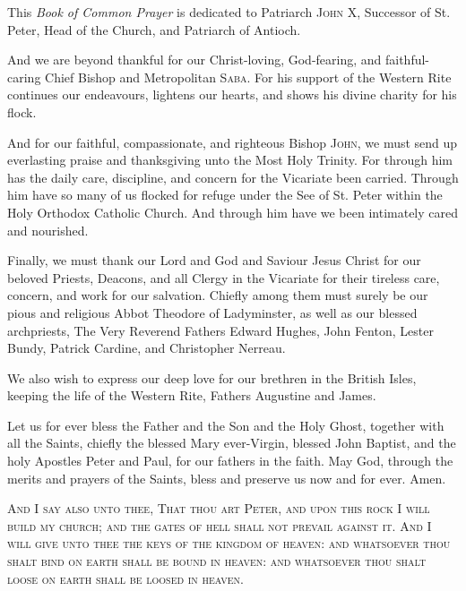 {}
\noindent
This \textit{Book of Common Prayer} is dedicated to Patriarch \textsc{John X},  Successor of St. Peter, Head of the Church, and Patriarch of Antioch.\\
\par\noindent
And we are beyond thankful for our Christ-loving, God-fearing, and faithful-caring Chief Bishop and Metropolitan \textsc{Saba}. For his support of the Western Rite continues our endeavours, lightens our hearts, and shows his divine charity for his flock.\\
\par\noindent
And for our faithful, compassionate, and righteous Bishop \textsc{John}, we must send up everlasting praise and thanksgiving unto the Most Holy Trinity. For through him has the daily care, discipline, and concern for the Vicariate been carried. Through him have so many of us flocked for refuge under the See of St. Peter within the Holy Orthodox Catholic Church. And through him have we been intimately cared and nourished.\\
\par\noindent
Finally, we must thank our Lord and God and Saviour Jesus Christ for our beloved Priests, Deacons, and all Clergy in the Vicariate for their tireless care, concern, and work for our salvation. Chiefly among them must surely be our pious and religious Abbot Theodore of Ladyminster, as well as our blessed archpriests, The Very Reverend Fathers Edward Hughes, John Fenton, Lester Bundy, Patrick Cardine, and Christopher Nerreau.\\
\par\noindent
We also wish to express our deep love for our brethren in the British Isles, keeping the life of the Western Rite, Fathers Augustine and James.\\
\par\noindent
Let us for ever bless the Father and the Son and the Holy Ghost, together with all the Saints, chiefly the blessed Mary ever-Virgin, blessed John Baptist, and the holy Apostles Peter and Paul, for our fathers in the faith. May God, through the merits and prayers of the Saints, bless and preserve us now and for ever. Amen.
\vfill
\begin{center}
\textsc{And I say also unto thee, That thou art Peter, and upon this rock I will build my church; and the gates of hell shall not prevail against it. And I will give unto thee the keys of the kingdom of heaven: and whatsoever thou shalt bind on earth shall be bound in heaven: and whatsoever thou shalt loose on earth shall be loosed in heaven.}
\end{center}